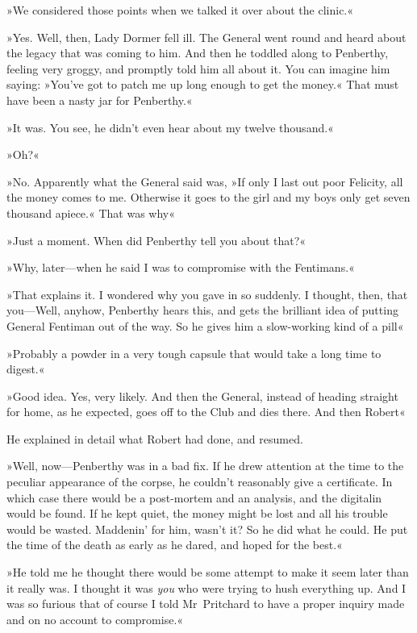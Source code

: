 »We considered those points when we talked it over about the clinic.«

»Yes. Well, then, Lady Dormer fell ill. The General went round and heard about the legacy that was coming to him. And then he toddled along to Penberthy, feeling very groggy, and promptly told him all about it. You can imagine him saying: »You've got to patch me up long enough to get the money.« That must have been a nasty jar for Penberthy.«

»It was. You see, he didn't even hear about my twelve thousand.«

»Oh?«

»No. Apparently what the General said was, »If only I last out poor Felicity, all the money comes to me. Otherwise it goes to the girl and my boys only get seven thousand apiece.« That was why\longdash«

»Just a moment. When did Penberthy tell you about that?«

»Why, later—when he said I was to compromise with the Fentimans.«

»That explains it. I wondered why you gave in so suddenly. I thought, then, that you—Well, anyhow, Penberthy hears this, and gets the brilliant idea of putting General Fentiman out of the way. So he gives him a slow-working kind of a pill\longdash«

»Probably a powder in a very tough capsule that would take a long time to digest.«

»Good idea. Yes, very likely. And then the General, instead of heading straight for home, as he expected, goes off to the Club and dies there. And then Robert\longdash«

He explained in detail what Robert had done, and resumed.

»Well, now—Penberthy was in a bad fix. If he drew attention at the time to the peculiar appearance of the corpse, he couldn't reasonably give a certificate. In which case there would be a post-mortem and an analysis, and the digitalin would be found. If he kept quiet, the money might be lost and all his trouble would be wasted. Maddenin' for him, wasn't it? So he did what he could. He put the time of the death as early as he dared, and hoped for the best.«

»He told me he thought there would be some attempt to make it seem later than it really was. I thought it was \textit{you} who were trying to hush everything up. And I was so furious that of course I told Mr~Pritchard to have a proper inquiry made and on no account to compromise.«

